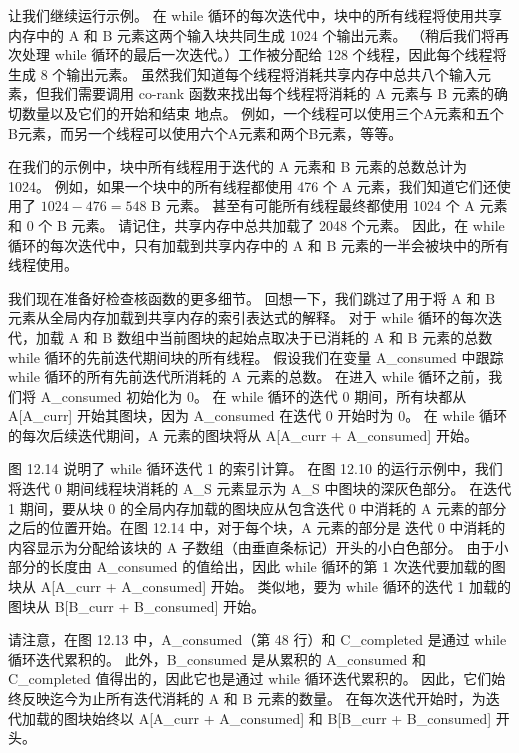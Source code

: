让我们继续运行示例。 在 while 循环的每次迭代中，块中的所有线程将使用共享内存中的 A 和 B 元素这两个输入块共同生成 1024 个输出元素。 （稍后我们将再次处理 while 循环的最后一次迭代。）工作被分配给 128 个线程，因此每个线程将生成 8 个输出元素。 虽然我们知道每个线程将消耗共享内存中总共八个输入元素，但我们需要调用 co-rank 函数来找出每个线程将消耗的 A 元素与 B 元素的确切数量以及它们的开始和结束 地点。 例如，一个线程可以使用三个A元素和五个B元素，而另一个线程可以使用六个A元素和两个B元素，等等。

在我们的示例中，块中所有线程用于迭代的 A 元素和 B 元素的总数总计为 1024。 例如，如果一个块中的所有线程都使用 476 个 A 元素，我们知道它们还使用了 $1024-476=548$ B 元素。 甚至有可能所有线程最终都使用 1024 个 A 元素和 0 个 B 元素。 请记住，共享内存中总共加载了 2048 个元素。 因此，在 while 循环的每次迭代中，只有加载到共享内存中的 A 和 B 元素的一半会被块中的所有线程使用。

我们现在准备好检查核函数的更多细节。 回想一下，我们跳过了用于将 $\mathrm{A}$ 和 $\mathrm{B}$ 元素从全局内存加载到共享内存的索引表达式的解释。 对于 while 循环的每次迭代，加载 A 和 B 数组中当前图块的起始点取决于已消耗的 $\mathrm{A}$ 和 $\mathrm{B}$ 元素的总数 while 循环的先前迭代期间块的所有线程。 假设我们在变量 A\_consumed 中跟踪 while 循环的所有先前迭代所消耗的 A 元素的总数。 在进入 while 循环之前，我们将 A\_consumed 初始化为 0。 在 while 循环的迭代 0 期间，所有块都从 A[A\_curr] 开始其图块，因为 A\_consumed 在迭代 0 开始时为 0。 在 while 循环的每次后续迭代期间，A 元素的图块将从 A[A\_curr + A\_consumed] 开始。

图 12.14 说明了 while 循环迭代 1 的索引计算。 在图 12.10 的运行示例中，我们将迭代 0 期间线程块消耗的 A\_S 元素显示为 A\_S 中图块的深灰色部分。 在迭代 1 期间，要从块 0 的全局内存加载的图块应从包含迭代 0 中消耗的 A 元素的部分之后的位置开始。在图 12.14 中，对于每个块，A 元素的部分是 迭代 0 中消耗的内容显示为分配给该块的 A 子数组（由垂直条标记）开头的小白色部分。 由于小部分的长度由 A\_consumed 的值给出，因此 while 循环的第 1 次迭代要加载的图块从 A[A\_curr + A\_consumed] 开始。 类似地，要为 while 循环的迭代 1 加载的图块从 B[B\_curr + B\_consumed] 开始。

请注意，在图 12.13 中，A\_consumed（第 48 行）和 C\_completed 是通过 while 循环迭代累积的。 此外，B\_consumed 是从累积的 A\_consumed 和 C\_completed 值得出的，因此它也是通过 while 循环迭代累积的。 因此，它们始终反映迄今为止所有迭代消耗的 $\mathrm{A}$ 和 $\mathrm{B}$ 元素的数量。 在每次迭代开始时，为迭代加载的图块始终以 A[A\_curr + A\_consumed] 和 B[B\_curr + B\_consumed] 开头。

